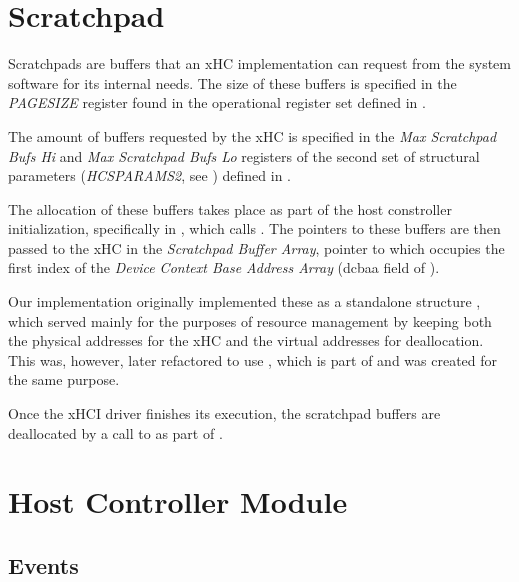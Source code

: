 

\section{Scratchpad}
\label{sec:scratchpads}

Scratchpads are buffers that an xHC implementation can request from the system software
for its internal needs. The size of these buffers is specified in the \textit{PAGESIZE} register
found in the operational register set defined in .

The amount of buffers requested by the xHC is specified in the \textit{Max Scratchpad Bufs Hi} and
\textit{Max Scratchpad Bufs Lo} registers of the second set of structural parameters (\textit{HCSPARAMS2},
see ) defined in .

The allocation of these buffers takes place as part of the host constroller initialization,
specifically in , which calls . The pointers
to these buffers are then passed to the xHC in the \textit{Scratchpad Buffer Array}, pointer to which
occupies the first index of the \textit{Device Context Base Address Array} (dcbaa field of
).

Our implementation originally implemented these as a standalone structure ,
which served mainly for the purposes of resource management by keeping both the physical addresses
for the xHC and the virtual addresses for deallocation. This was, however, later refactored to use
, which is part of  and was created for the same purpose.

Once the xHCI driver finishes its execution, the scratchpad buffers are deallocated by a call to
 as part of .




\section{Host Controller Module}

\subsection{Events}
\label{sec:events}


